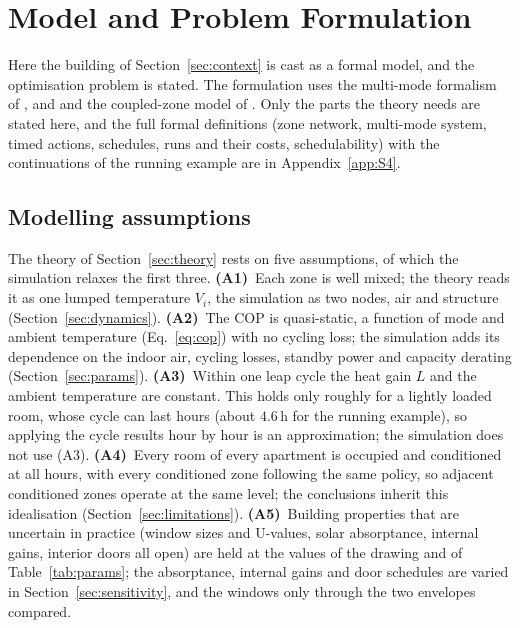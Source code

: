 \documentclass[10pt,a4paper,twocolumn]{article}
\theoremstyle{definition}
\newcommand{\exCycleHr}{4.6}
\begin{document}
\section{Model and Problem Formulation}\label{sec:model}
Here the building of Section~\ref{sec:context} is cast as a formal model, and the optimisation problem is stated. The formulation uses the multi-mode formalism of \citet{alur2012optimal}, \citet{wojtczak2013optimal} and \citet{mousa2017optimal} and the coupled-zone model of \citet{nghiem2012scalable}. Only the parts the theory needs are stated here, and the full formal definitions (zone network, multi-mode system, timed actions, schedules, runs and their costs, schedulability) with the continuations of the running example are in Appendix~\ref{app:S4}.

\subsection{Modelling assumptions}\label{sec:assumptions}
The theory of Section~\ref{sec:theory} rests on five assumptions, of which the simulation relaxes the first three. \textbf{(A1)}~Each zone is well mixed; the theory reads it as one lumped temperature $V_i$, the simulation as two nodes, air and structure (Section~\ref{sec:dynamics}). \textbf{(A2)}~The COP is quasi-static, a function of mode and ambient temperature (Eq.~\eqref{eq:cop}) with no cycling loss; the simulation adds its dependence on the indoor air, cycling losses, standby power and capacity derating (Section~\ref{sec:params}). \textbf{(A3)}~Within one leap cycle the heat gain $L$ and the ambient temperature are constant. This holds only roughly for a lightly loaded room, whose cycle can last hours (about $\exCycleHr\,$h for the running example), so applying the cycle results hour by hour is an approximation; the simulation does not use (A3). \textbf{(A4)}~Every room of every apartment is occupied and conditioned at all hours, with every conditioned zone following the same policy, so adjacent conditioned zones operate at the same level; the conclusions inherit this idealisation (Section~\ref{sec:limitations}). \textbf{(A5)}~Building properties that are uncertain in practice (window sizes and U-values, solar absorptance, internal gains, interior doors all open) are held at the values of the drawing and of Table~\ref{tab:params}; the absorptance, internal gains and door schedules are varied in Section~\ref{sec:sensitivity}, and the windows only through the two envelopes compared.
\end{document}
